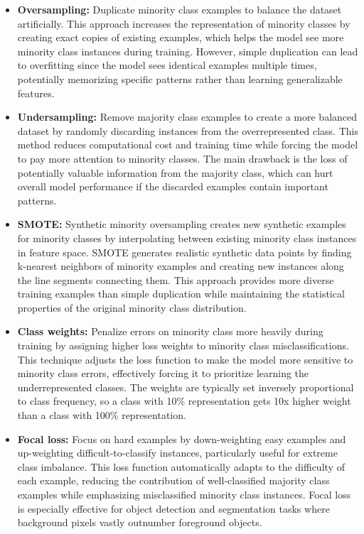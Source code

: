 \begin{itemize}
    \item \textbf{Oversampling:} Duplicate minority class examples to balance the dataset artificially. This approach increases the representation of minority classes by creating exact copies of existing examples, which helps the model see more minority class instances during training. However, simple duplication can lead to overfitting since the model sees identical examples multiple times, potentially memorizing specific patterns rather than learning generalizable features.
    
    \item \textbf{Undersampling:} Remove majority class examples to create a more balanced dataset by randomly discarding instances from the overrepresented class. This method reduces computational cost and training time while forcing the model to pay more attention to minority classes. The main drawback is the loss of potentially valuable information from the majority class, which can hurt overall model performance if the discarded examples contain important patterns.
    
    \item \textbf{SMOTE:} Synthetic minority oversampling creates new synthetic examples for minority classes by interpolating between existing minority class instances in feature space. SMOTE generates realistic synthetic data points by finding k-nearest neighbors of minority examples and creating new instances along the line segments connecting them. This approach provides more diverse training examples than simple duplication while maintaining the statistical properties of the original minority class distribution.
    
    \item \textbf{Class weights:} Penalize errors on minority class more heavily during training by assigning higher loss weights to minority class misclassifications. This technique adjusts the loss function to make the model more sensitive to minority class errors, effectively forcing it to prioritize learning the underrepresented classes. The weights are typically set inversely proportional to class frequency, so a class with 10\% representation gets 10x higher weight than a class with 100\% representation.
    
    \item \textbf{Focal loss:} Focus on hard examples by down-weighting easy examples and up-weighting difficult-to-classify instances, particularly useful for extreme class imbalance. This loss function automatically adapts to the difficulty of each example, reducing the contribution of well-classified majority class examples while emphasizing misclassified minority class instances. Focal loss is especially effective for object detection and segmentation tasks where background pixels vastly outnumber foreground objects.
\end{itemize}

